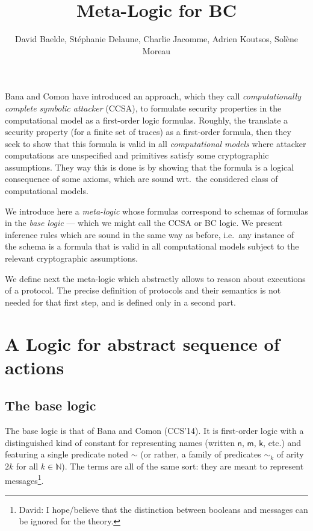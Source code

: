 \documentclass[a4paper]{article}
\theoremstyle{remark}
\begin{document}
\title{Meta-Logic for BC}

\author{David Baelde, Stéphanie Delaune,
  Charlie Jacomme, Adrien Koutsos, Solène Moreau}

\maketitle

Bana and Comon have introduced an approach, which they call
\emph{computationally complete symbolic attacker} (CCSA),
to formulate security properties in the computational model as a first-order
logic formulas. Roughly, the translate a security property (for a finite set
of traces) as a first-order formula, then they seek to show that this formula
is valid in all \emph{computational models} where attacker computations
are unspecified and primitives satisfy some cryptographic assumptions. They
way this is done is by showing that the formula is a logical consequence of
some axioms, which are sound wrt.\ the considered class of computational 
models.

We introduce here a \emph{meta-logic} whose formulas correspond to schemas
of formulas in the \emph{base logic}
--- which we might call the CCSA or BC logic.
We present inference rules which are sound in the same way as before,
i.e.\ any instance of the schema is a formula that is valid in all
computational models subject to the relevant cryptographic assumptions.

We define next the meta-logic which abstractly allows to reason about
executions of a protocol. The precise definition of protocols and their
semantics is not needed for that first step, and is defined only in a
second part.

\section{A Logic for abstract sequence of actions}

\subsection{The base logic}

The base logic is that of Bana and Comon (CCS'14). It is first-order logic
with a distinguished kind of constant for representing names (written
$\mathsf{n}$, $\mathsf{m}$, $\mathsf{k}$, etc.)
and featuring a single predicate noted $\sim$ (or rather, a family
of predicates $\sim_k$ of arity $2 k$ for all $k\in\mathbb{N}$).
The terms are all of the same sort: they are meant to represent 
messages\footnote{
  David: I hope/believe that the distinction between booleans and messages
  can be ignored for the theory.
}.
\end{document}
